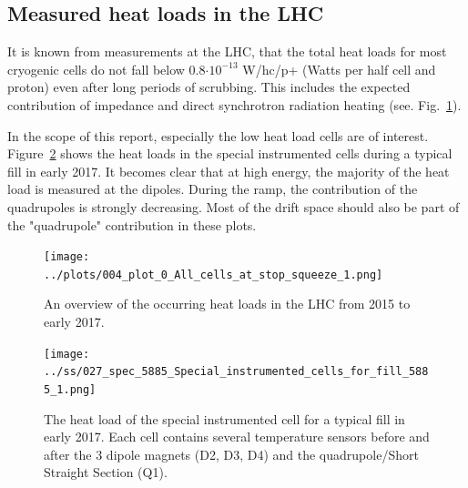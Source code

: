 \subsection{Measured heat loads in the LHC}
\label{seq:measured}

It is known from measurements at the LHC, that the total heat loads for most cryogenic cells do not fall below 0.8$\cdot10^{-13}$ W/hc/p+ (Watts per half cell and proton) even after long periods of scrubbing.
This includes the expected contribution of impedance and direct synchrotron radiation heating (see. Fig.~\ref{fig:measured_hl}).

In the scope of this report, especially the low heat load cells are of interest.
Figure~\ref{fig:special} shows the heat loads in the special instrumented cells during a typical fill in early 2017.
It becomes clear that at high energy, the majority of the heat load is measured at the dipoles.
During the ramp, the contribution of the quadrupoles is strongly decreasing.
Most of the drift space should also be part of the "quadrupole" contribution in these plots.

\begin{figure}[tbh]
    \centering
    \texttt{[image: ../plots/004\_plot\_0\_All\_cells\_at\_stop\_squeeze\_1.png]}
    \caption{An overview of the occurring heat loads in the LHC from 2015 to early 2017.}
    \label{fig:measured_hl}
\end{figure}

\begin{figure}[tbh]
    \centering
    \texttt{[image: ../ss/027\_spec\_5885\_Special\_instrumented\_cells\_for\_fill\_5885\_1.png]}
    \caption{The heat load of the special instrumented cell for a typical fill in early 2017.
    Each cell contains several temperature sensors before and after the 3 dipole magnets (D2, D3, D4) and the quadrupole/Short Straight Section (Q1).}
    \label{fig:special}
\end{figure}



\clearpage

